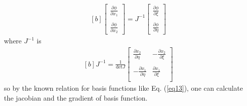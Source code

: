 \documentclass[]{article}
\begin{document}
\begin{equation}\label{eq17}
	\begin{aligned}[b]
		\begin{bmatrix}
			\frac{\partial \phi}{\partial x_{1}}\\
			\\
			\frac{\partial \phi}{\partial x_{2}}  
		\end{bmatrix}
		= J^{-1}
		\begin{bmatrix}
			\frac{\partial \phi}{\partial \xi}\\
			\\
			\frac{\partial \phi}{\partial \eta}
		\end{bmatrix}
	\end{aligned}
\end{equation}
where $J^{-1}$ is
\begin{equation}\label{eq18}
	\begin{aligned}[b]
		J^{-1} = \frac{1}{\mathrm{det}J}\begin{bmatrix}
			 \frac{\partial x_{2}}{\partial \eta}    & -\frac{\partial x_{2}}{\partial \xi} \\
			\\
			-\frac{\partial x_{1}}{\partial \eta}      &\frac{\partial x_{1}}{\partial \xi}\\
		\end{bmatrix}
	\end{aligned}
\end{equation}
so by the known relation for basis functions like Eq. (\ref{eq13}), one can calculate the jacobian and the gradient of basis function.
\end{document}
